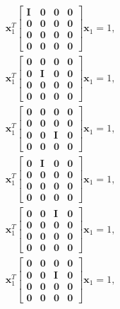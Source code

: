 \documentclass{article}
\begin{document}
\begin{align}
    \mathbf{x}_1^T  \begin{bmatrix} \mathbf{I} & \mathbf{0} & \mathbf{0} & \mathbf{0} \\ \mathbf{0} & \mathbf{0} & \mathbf{0} & \mathbf{0} \\ \mathbf{0} & \mathbf{0} & \mathbf{0} & \mathbf{0} \\ \mathbf{0} & \mathbf{0} & \mathbf{0} & \mathbf{0} \end{bmatrix} \mathbf{x}_1 = 1,\\
    \mathbf{x}_1^T  \begin{bmatrix} \mathbf{0} & \mathbf{0} & \mathbf{0} & \mathbf{0} \\ \mathbf{0} & \mathbf{I} & \mathbf{0} & \mathbf{0} \\ \mathbf{0} & \mathbf{0} & \mathbf{0} & \mathbf{0} \\ \mathbf{0} & \mathbf{0} & \mathbf{0} & \mathbf{0} \end{bmatrix} \mathbf{x}_1 = 1,\\
    \mathbf{x}_1^T  \begin{bmatrix} \mathbf{0} & \mathbf{0} & \mathbf{0} & \mathbf{0} \\ \mathbf{0} & \mathbf{0} & \mathbf{0} & \mathbf{0} \\ \mathbf{0} & \mathbf{0} & \mathbf{I} & \mathbf{0} \\ \mathbf{0} & \mathbf{0} & \mathbf{0} & \mathbf{0} \end{bmatrix} \mathbf{x}_1 = 1,\\
    \mathbf{x}_1^T  \begin{bmatrix} \mathbf{0} & \mathbf{I} & \mathbf{0} & \mathbf{0} \\ \mathbf{0} & \mathbf{0} & \mathbf{0} & \mathbf{0} \\ \mathbf{0} & \mathbf{0} & \mathbf{0} & \mathbf{0} \\ \mathbf{0} & \mathbf{0} & \mathbf{0} & \mathbf{0} \end{bmatrix} \mathbf{x}_1 = 1,\\
    \mathbf{x}_1^T  \begin{bmatrix} \mathbf{0} & \mathbf{0} & \mathbf{I} & \mathbf{0} \\ \mathbf{0} & \mathbf{0} & \mathbf{0} & \mathbf{0} \\ \mathbf{0} & \mathbf{0} & \mathbf{0} & \mathbf{0} \\ \mathbf{0} & \mathbf{0} & \mathbf{0} & \mathbf{0} \end{bmatrix} \mathbf{x}_1 = 1,\\
    \mathbf{x}_1^T  \begin{bmatrix} \mathbf{0} & \mathbf{0} & \mathbf{0} & \mathbf{0} \\ \mathbf{0} & \mathbf{0} & \mathbf{I} & \mathbf{0} \\ \mathbf{0} & \mathbf{0} & \mathbf{0} & \mathbf{0} \\ \mathbf{0} & \mathbf{0} & \mathbf{0} & \mathbf{0} \end{bmatrix} \mathbf{x}_1 = 1,\\
\end{align}
\end{document}
